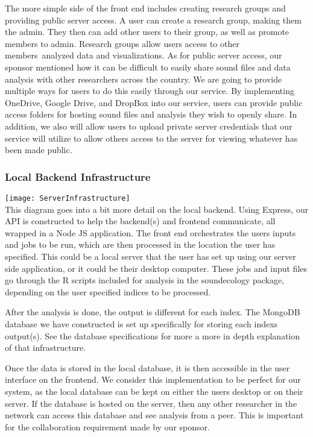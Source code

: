 The more simple side of the front end includes creating research groups and providing public server access. A user can create a research group, making them the admin. They then can add other users to their group, as well as promote members to admin. Research groups allow users access to other members\textquotesingle\ analyzed data and visualizations. As for public server access, our sponsor mentioned how it can be difficult to easily share sound files and data analysis with other researchers across the country. We are going to provide multiple ways for users to do this easily through our service. By implementing OneDrive, Google Drive, and DropBox into our service, users can provide public access folders for hosting sound files and analysis they wish to openly share. In addition, we also will allow users to upload private server credentials that our service will utilize to allow others access to the server for viewing whatever has been made public.

\subsubsection{Local Backend Infrastructure}
\texttt{[image: ServerInfrastructure]} \\
This diagram goes into a bit more detail on the local backend. Using Express, our API is constructed to help the backend(s) and frontend communicate, all wrapped in a Node JS application. The front end orchestrates the user\textquotesingle s inputs and jobs to be run, which are then processed in the location the user has specified. This could be a local server that the user has set up using our server side application, or it could be their desktop computer. These jobs and input files go through the R scripts included for analysis in the soundecology package, depending on the user specified indices to be processed.\par
After the analysis is done, the output is different for each index. The MongoDB database we have constructed is set up specifically for storing each index\textquotesingle s output(s). See the database specifications for more a more in depth explanation of that infrastructure.\par
Once the data is stored in the local database, it is then accessible in the user interface on the frontend. We consider this implementation to be perfect for our system, as the local database can be kept on either the user\textquotesingle s desktop or on their server. If the database is hosted on the server, then any other researcher in the network can access this database and see analysis from a peer. This is important for the collaboration requirement made by our sponsor.

